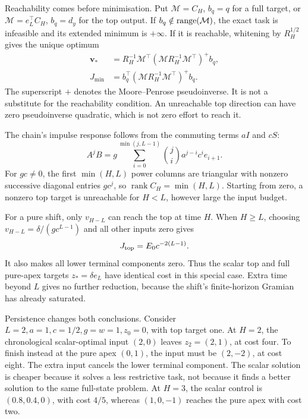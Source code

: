 Reachability comes before minimisation. Put \(\mathcal M=C_H\), \(b_q=q\) for a full target, or \(\mathcal M=e_L^\top C_H\), \(b_q=d_y\) for the top output. If \(b_q\notin\operatorname{range}(\mathcal M)\), the exact task is infeasible and its extended minimum is \(+\infty\). If it is reachable, whitening by \(R_H^{1/2}\) gives the unique optimum
\begin{align}
 \bm v_*&=R_H^{-1}\mathcal M^\top
       (\mathcal M R_H^{-1}\mathcal M^\top)^+b_q,\nonumber\\
 J_{\min}&=b_q^\top(\mathcal M R_H^{-1}\mathcal M^\top)^+b_q.
 \label{hrec:eq:min-effort}
\end{align}
The superscript \(+\) denotes the Moore--Penrose pseudoinverse. It is not a substitute for the reachability condition. An unreachable top direction can have zero pseudoinverse quadratic, which is not zero effort to reach it.

The chain's impulse response follows from the commuting terms \(aI\) and \(cS\):
\begin{equation}
 A^jB=g\sum_{i=0}^{\min(j,L-1)}
       \binom ji a^{j-i}c^i e_{i+1}.
 \label{hrec:eq:impulse}
\end{equation}
For \(gc\ne0\), the first \(\min(H,L)\) power columns are triangular with nonzero successive diagonal entries \(gc^j\), so \(\operatorname{rank}C_H=\min(H,L)\). Starting from zero, a nonzero top target is unreachable for \(H<L\), however large the input budget.

For a pure shift, only \(v_{H-L}\) can reach the top at time \(H\). When \(H\ge L\), choosing \(v_{H-L}=\delta/(gc^{L-1})\) and all other inputs zero gives
\begin{equation}
 J_{\rm top}=E_0c^{-2(L-1)}.
 \label{hrec:eq:shift-cost}
\end{equation}
It also makes all lower terminal components zero. Thus the scalar top and full pure-apex targets \(z_*=\delta e_L\) have identical cost in this special case. Extra time beyond \(L\) gives no further reduction, because the shift's finite-horizon Gramian has already saturated.

Persistence changes both conclusions. Consider \(L=2,a=1,c=1/2,g=w=1,z_0=0\), with top target one. At \(H=2\), the chronological scalar-optimal input \((2,0)\) leaves \(z_2=(2,1)\), at cost four. To finish instead at the pure apex \((0,1)\), the input must be \((2,-2)\), at cost eight. The extra input cancels the lower terminal component. The scalar solution is cheaper because it solves a less restrictive task, not because it finds a better solution to the same full-state problem. At \(H=3\), the scalar control is \((0.8,0.4,0)\), with cost \(4/5\), whereas \((1,0,-1)\) reaches the pure apex with cost two.

